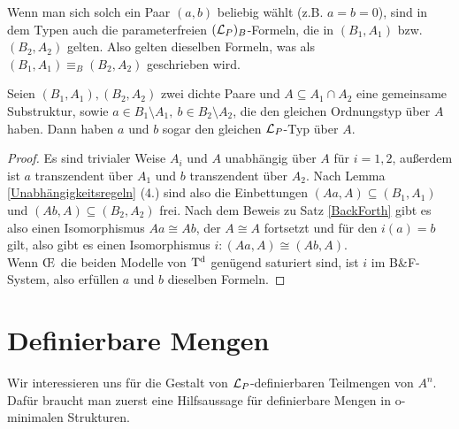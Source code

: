 \begin{corollary}
	Wenn man sich solch ein Paar $(a,b)$ beliebig wählt (z.B. $a=b=0$), sind in dem Typen auch die parameterfreien $(\mathcal{L}_P)_B$-Formeln, die in $(B_1,A_1)$ bzw. $(B_2,A_2)$ gelten. Also gelten dieselben Formeln, was als $(B_1,A_1)\equiv_B(B_2,A_2)$ geschrieben wird.
\end{corollary}

\begin{lemma}
	Seien $(B_1,A_1),(B_2,A_2)$ zwei dichte Paare und $A\subseteq A_1\cap A_2$ eine gemeinsame Substruktur, sowie $a\in B_1\setminus A_1,\ b\in B_2\setminus A_2$, die den gleichen Ordnungstyp über $A$ haben. Dann haben $a$ und $b$ sogar den gleichen $\mathcal{L}_P$-Typ über $A$.
\end{lemma}
\begin{proof}
	Es sind trivialer Weise $A_i$ und $A$ unabhängig über $A$ für $i=1,2$, außerdem ist $a$ transzendent über $A_1$ und $b$ transzendent über $A_2$. Nach Lemma \ref{Unabhängigkeitsregeln} (4.) sind also die Einbettungen $(Aa,A)\subseteq(B_1,A_1)$ und $(Ab,A)\subseteq(B_2,A_2)$ frei. Nach dem Beweis zu Satz \ref{BackForth} gibt es also einen Isomorphismus $Aa\cong Ab$, der $A\cong A$ fortsetzt und für den $i(a)=b$ gilt, also gibt es einen Isomorphismus $i:(Aa,A)\cong(Ab,A)$.\\ Wenn \OE\ die beiden Modelle von $\operatorname{T^d}$ genügend saturiert sind, ist $i$ im B\&F-System, also erfüllen $a$ und $b$ dieselben Formeln.
\end{proof}

\section{Definierbare Mengen}
Wir interessieren uns für die Gestalt von $\mathcal{L}_P$-definierbaren Teilmengen von $A^n$. Dafür braucht man zuerst eine Hilfsaussage für definierbare Mengen in o-minimalen Strukturen.

